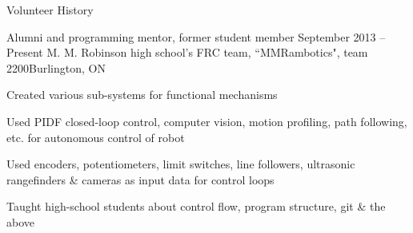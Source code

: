 \documentclass{resume}
\begin{document}
  \begin{rSection}{Volunteer History}
  	\begin{rSubsection}{Alumni and programming mentor, former student member}
  		{September 2013 – Present}
  		{M. M. Robinson high school's FRC team, “MMRambotics", team 2200}{Burlington, ON}
  		\item {Created various sub-systems for functional mechanisms}
  		\item {Used PIDF closed-loop control, computer vision, motion profiling, path following, 
  			etc. for autonomous control of robot}
  		\item {Used encoders, potentiometers, limit switches, line followers, ultrasonic rangefinders
  			\& cameras as input data for control loops}
  		\item {Taught high-school students about control flow, program structure, git \& the above}
  	\end{rSubsection}
  \end{rSection}

\end{document}

